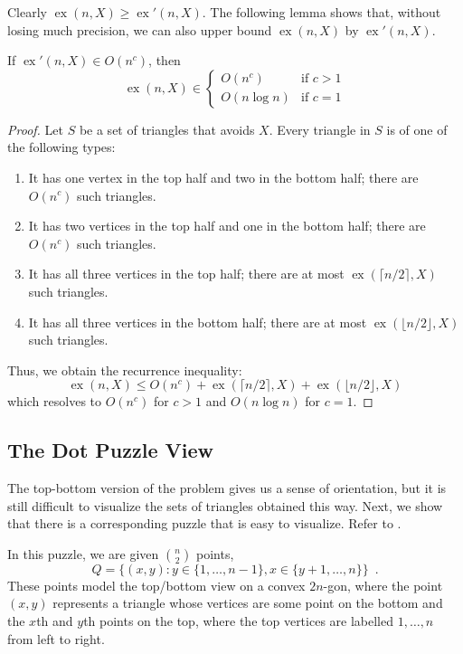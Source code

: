 \documentclass{patmorin}
\DeclareMathOperator{\ex}{ex}
\begin{document}
Clearly $\ex(n,X)\ge\ex'(n,X)$.  The following lemma shows that, without
losing much precision, we can also upper bound $\ex(n,X)$ by $\ex'(n,X)$.

\begin{lem}
  If $\ex'(n,X)\in O(n^c)$, then
  \[
     \ex(n,X)\in 
        \begin{cases} 
            O(n^c)     & \text{if $c>1$} \\
            O(n\log n) & \text{if $c=1$}
        \end{cases}
  \]
\end{lem}

\begin{proof}
   Let $S$ be a set of triangles that avoids $X$.  Every triangle in $S$
   is of one of the following types:
   \begin{enumerate}
      \item It has one vertex in the top half and two in the bottom half;
        there are $O(n^{c})$ such triangles.
      \item It has two vertices in the top half and one in the bottom
        half; there are $O(n^{c})$ such triangles.
      \item It has all three vertices in the top half; there are at most
        $\ex(\lceil n/2\rceil,X)$ such triangles.
      \item It has all three vertices in the bottom half; there are at
        most $\ex(\lfloor n/2\rfloor,X)$ such triangles.
   \end{enumerate}
   Thus, we obtain the recurrence inequality:
   \[  \ex(n,X) \le O(n^{c}) + \ex(\lceil n/2\rceil,X) + \ex(\lfloor n/2\rfloor,X) \]
   which resolves to $O(n^c)$ for $c>1$ and $O(n\log n)$ for $c=1$.
\end{proof}


\subsection{The Dot Puzzle View}

The top-bottom version of the problem gives us a sense of orientation,
but it is still difficult to visualize the sets of triangles obtained
this way. Next, we show that there is a corresponding puzzle that is
easy to visualize.  Refer to .  

In this puzzle, we are given $\binom{n}{2}$ points,
\[
    Q = \{(x,y): y\in\{1,\ldots,n-1\}, x\in\{y+1,\ldots,n\} \} \enspace .
\]
These points model the top/bottom view on a convex $2n$-gon, where the
point $(x,y)$ represents a triangle whose vertices are some point on
the bottom and the $x$th and $y$th points on the top, where the top
vertices are labelled $1,\ldots,n$ from left to right.
\end{document}
